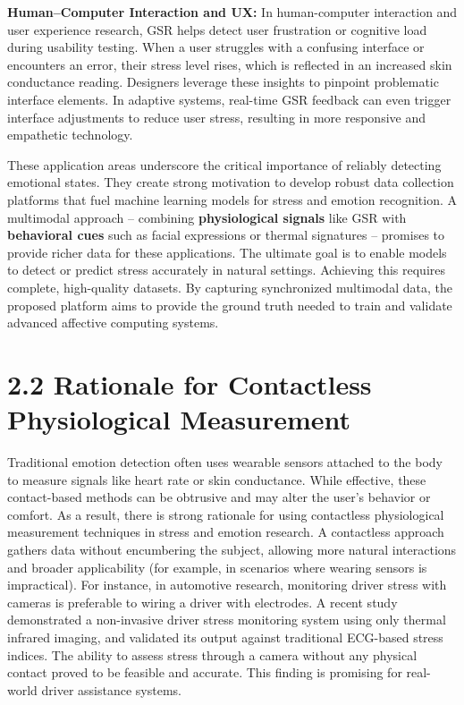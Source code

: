 \documentclass[11pt,a4paper]{report}
\begin{document}
\textbf{Human–Computer Interaction and UX:} In human-computer interaction and user experience research, GSR helps detect user frustration or cognitive load during usability testing. When a user struggles with a confusing interface or encounters an error, their stress level rises, which is reflected in an increased skin conductance reading\cite{Picard2001}. Designers leverage these insights to pinpoint problematic interface elements. In adaptive systems, real-time GSR feedback can even trigger interface adjustments to reduce user stress, resulting in more responsive and empathetic technology.

These application areas underscore the critical importance of reliably detecting emotional states. They create strong motivation to develop robust data collection platforms that fuel machine learning models for stress and emotion recognition. A multimodal approach – combining \textbf{physiological signals} like GSR with \textbf{behavioral cues} such as facial expressions or thermal signatures – promises to provide richer data for these applications. The ultimate goal is to enable models to detect or predict stress accurately in natural settings. Achieving this requires complete, high-quality datasets. By capturing synchronized multimodal data, the proposed platform aims to provide the ground truth needed to train and validate advanced affective computing systems.

\section{2.2 Rationale for Contactless Physiological Measurement}

Traditional emotion detection often uses wearable sensors attached to the body to measure signals like heart rate or skin conductance. While effective, these contact-based methods can be obtrusive and may alter the user's behavior or comfort. As a result, there is strong rationale for using contactless physiological measurement techniques in stress and emotion research. A contactless approach gathers data without encumbering the subject, allowing more natural interactions and broader applicability (for example, in scenarios where wearing sensors is impractical). For instance, in automotive research, monitoring driver stress with cameras is preferable to wiring a driver with electrodes. A recent study demonstrated a non-invasive driver stress monitoring system using only thermal infrared imaging, and validated its output against traditional ECG-based stress indices\cite{DriverStressThermal2020}. The ability to assess stress through a camera without any physical contact proved to be feasible and accurate. This finding is promising for real-world driver assistance systems.
\end{document}
